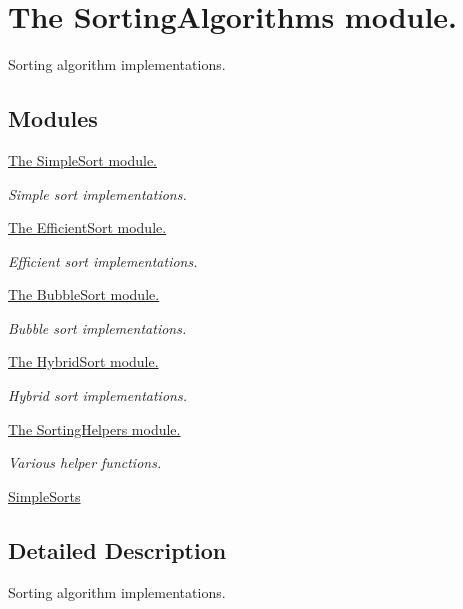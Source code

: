 \hypertarget{group__SortingAlgorithms}{}\section{The Sorting\+Algorithms module.}
\label{group__SortingAlgorithms}


Sorting algorithm implementations.  


\subsection*{Modules}
\begin{DoxyCompactItemize}
\item 
\hyperlink{group__SimpleSort}{The Simple\+Sort module.}
\begin{DoxyCompactList}\small\item\em Simple sort implementations. \end{DoxyCompactList}\item 
\hyperlink{group__EfficientSort}{The Efficient\+Sort module.}
\begin{DoxyCompactList}\small\item\em Efficient sort implementations. \end{DoxyCompactList}\item 
\hyperlink{group__BubbleSort}{The Bubble\+Sort module.}
\begin{DoxyCompactList}\small\item\em Bubble sort implementations. \end{DoxyCompactList}\item 
\hyperlink{group__HybridSort}{The Hybrid\+Sort module.}
\begin{DoxyCompactList}\small\item\em Hybrid sort implementations. \end{DoxyCompactList}\item 
\hyperlink{group__SortingHelpers}{The Sorting\+Helpers module.}
\begin{DoxyCompactList}\small\item\em Various helper functions. \end{DoxyCompactList}\item 
\hyperlink{group__SimpleSorts}{Simple\+Sorts}
\end{DoxyCompactItemize}


\subsection{Detailed Description}
Sorting algorithm implementations. 

